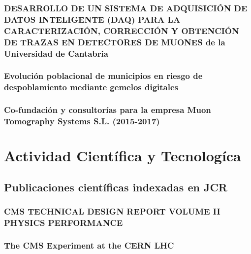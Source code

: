 \documentclass[a4paper, 11pt, twoside, openright]{report}
\begin{document}
\subsection{DESARROLLO DE UN SISTEMA DE ADQUISICIÓN DE DATOS INTELIGENTE (DAQ) PARA LA CARACTERIZACIÓN, CORRECCIÓN Y OBTENCIÓN DE TRAZAS EN DETECTORES DE MUONES de la Universidad de Cantabria}


\subsection{Evolución poblacional de municipios en riesgo de despoblamiento mediante gemelos digitales}


\subsection{Co-fundación y consultorías para la empresa Muon Tomography Systems S.L. (2015-2017)}



\chapter{Actividad Científica y Tecnologíca}

\section{Publicaciones científicas indexadas en JCR}

\subsection{CMS TECHNICAL DESIGN REPORT VOLUME II PHYSICS PERFORMANCE}


\subsection{The CMS Experiment at the CERN LHC}

\end{document}
